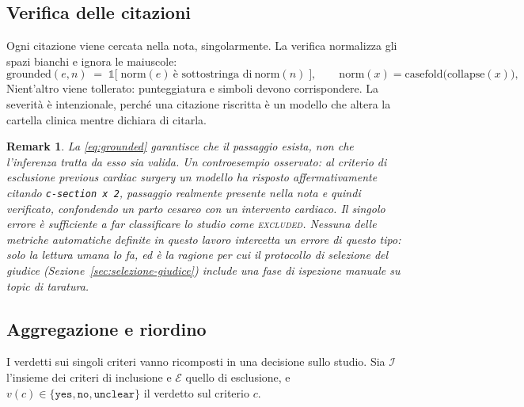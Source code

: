 \documentclass[pdflatex,sn-mathphys-num]{sn-jnl}
\theoremstyle{thmstyleone}
\theoremstyle{thmstyletwo}
\newtheorem{remark}{Remark}
\theoremstyle{thmstylethree}
\begin{document}
\subsection{Verifica delle citazioni}\label{sec:grounding}

Ogni citazione viene cercata nella nota, singolarmente. La verifica normalizza gli spazi bianchi e ignora le maiuscole:
\begin{equation}
  \mathrm{grounded}(e, n) \;=\; \mathds{1}\big[\;\mathrm{norm}(e) \ \text{è sottostringa di} \ \mathrm{norm}(n)\;\big],
  \qquad
  \mathrm{norm}(x) = \mathrm{casefold}\big(\mathrm{collapse}(x)\big),
  \label{eq:grounded}
\end{equation}
Nient'altro viene tollerato: punteggiatura e simboli devono corrispondere. La severità è intenzionale, perché una citazione riscritta è un modello che altera la cartella clinica mentre dichiara di citarla.

\begin{remark}\label{rem:limite-grounding}
La \eqref{eq:grounded} garantisce che il passaggio \emph{esista}, non che l'inferenza tratta da esso sia valida. Un controesempio osservato: al criterio di esclusione \emph{previous cardiac surgery} un modello ha risposto affermativamente citando \texttt{c-section x 2}, passaggio realmente presente nella nota e quindi verificato, confondendo un parto cesareo con un intervento cardiaco. Il singolo errore è sufficiente a far classificare lo studio come \textsc{excluded}. Nessuna delle metriche automatiche definite in questo lavoro intercetta un errore di questo tipo: solo la lettura umana lo fa, ed è la ragione per cui il protocollo di selezione del giudice (Sezione~\ref{sec:selezione-giudice}) include una fase di ispezione manuale su topic di taratura.
\end{remark}

\subsection{Aggregazione e riordino}\label{sec:aggregazione}

I verdetti sui singoli criteri vanno ricomposti in una decisione sullo studio. Sia $\mathcal{I}$ l'insieme dei criteri di inclusione e $\mathcal{E}$ quello di esclusione, e $v(c) \in \{\texttt{yes}, \texttt{no}, \texttt{unclear}\}$ il verdetto sul criterio $c$.
\end{document}
